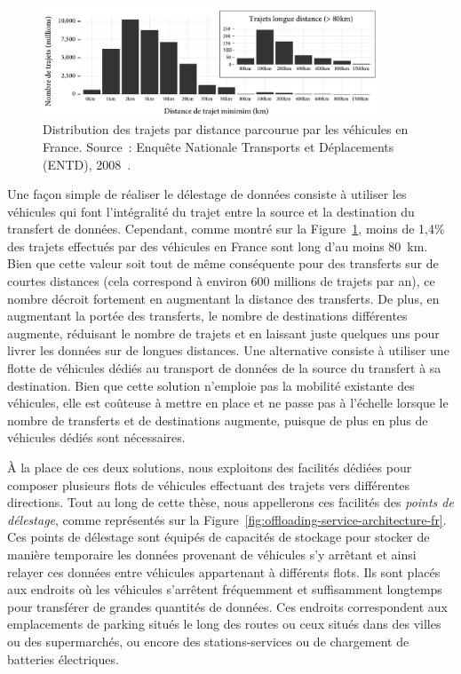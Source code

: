  \begin{figure}[h!]
   \centering
   \includegraphics[width=0.9\textwidth]{figures-fr/entd-fr.pdf}
   \caption{Distribution des trajets par distance parcourue par les véhicules en France. Source~: Enquête Nationale Transports et Déplacements (ENTD), 2008~\cite{ENTD}.}
   \label{fig:entd-fr}
\end{figure}
 
Une façon simple de réaliser le délestage de données consiste à utiliser les véhicules qui font l’intégralité du trajet entre la source et la destination du transfert de données. Cependant, comme montré sur la Figure~\ref{fig:entd-fr}, moins de 1,4\% des trajets effectués par des véhicules en France sont long d’au moins 80~km. Bien que cette valeur soit tout de même conséquente pour des transferts sur de courtes distances (cela correspond à environ 600 millions de trajets par an), ce nombre décroit fortement en augmentant la distance des transferts. De plus, en augmentant la portée des transferts, le nombre de destinations différentes augmente, réduisant le nombre de trajets et en laissant juste quelques uns pour livrer les données  sur de longues distances. Une alternative consiste à utiliser une flotte de véhicules dédiés au transport de données de la source du transfert à sa destination. Bien que cette solution n’emploie pas la mobilité existante des véhicules, elle est coûteuse à mettre en place et ne passe pas à l’échelle lorsque le nombre de transferts et de destinations augmente, puisque de plus en plus de véhicules dédiés sont nécessaires. 
 
À la place de ces deux solutions, nous exploitons des facilités dédiées pour composer plusieurs flots de véhicules effectuant des trajets vers différentes directions. Tout au long de cette thèse, nous appellerons ces facilités des \textit{points de délestage}, comme représentés sur la Figure~\ref{fig:offloading-service-architecture-fr}. Ces points de délestage sont équipés de capacités de stockage pour stocker de manière temporaire les données provenant de véhicules s’y arrêtant et ainsi relayer ces données entre véhicules appartenant à différents flots. Ils sont placés aux endroits où les véhicules s’arrêtent fréquemment et suffisamment longtemps pour transférer de grandes quantités de données. Ces endroits correspondent aux emplacements de parking situés le long des routes ou ceux situés dans des villes ou des supermarchés, ou encore des stations-services ou de chargement de batteries électriques. 
 
